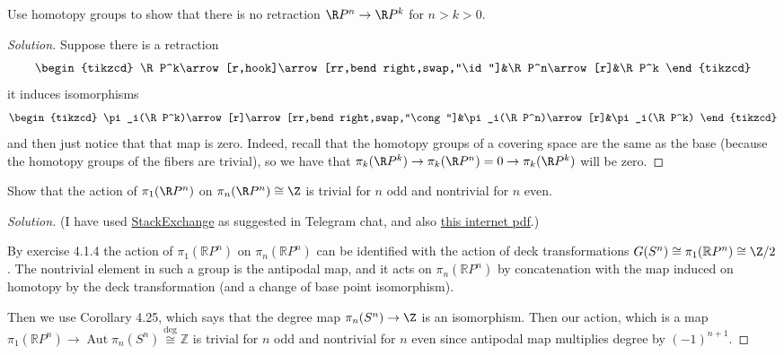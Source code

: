 \begin{exercise}[4.2.1]
	Use homotopy groups to show that there is no retraction $\R P^n\to \R P^k$ for $n>k>0$.
\end{exercise}
\begin{proof}[Solution]
	Suppose there is a retraction
	\[\begin{tikzcd}
		\R P^k\arrow[r,hook]\arrow[rr,bend right,swap,"\id"]&\R P^n\arrow[r]&\R P^k
	\end{tikzcd}\]
	it induces isomorphisms
	\[\begin{tikzcd}
		\pi_i(\R P^k)\arrow[r]\arrow[rr,bend right,swap,"\cong"]&\pi_i(\R P^n)\arrow[r]&\pi_i(\R P^k)
	\end{tikzcd}\]
	and then just notice that that map is zero. Indeed, recall that the homotopy groups of a covering space are the same as the base (because the homotopy groups of the fibers are trivial), so we have that $\pi_k(\R P^k)\to\pi_k(\R P^n)=0\to\pi_k(\R P^k)$ will be zero. 
\end{proof}

\begin{exercise}[4.2.2]
	Show that the action of $\pi_1(\R P^n)$ on $\pi_n(\R P^n)\cong\Z$ is trivial for $n$ odd and nontrivial for $n$ even.
\end{exercise}
\begin{proof}[Solution]
	(I have used \href{https://math.stackexchange.com/questions/375968/the-action-of-the-group-of-deck-transformation-on-the-higher-homotopy-groups}{StackExchange} as suggested in Telegram chat, and also \href{https://pages.uoregon.edu/njp/hw7solutions.pdf}{this internet pdf}.)

	By exercise 4.1.4 the action of $\pi_{1}(\mathbb{R}P^{n})$ on $\pi_{n}(\mathbb{R}P^{n})$ can be identified with the action of deck transformations $G(S^{n})\cong \pi_{1}(\mathbb{R}P^{n})\cong \Z/2$. The nontrivial element in such a group is the antipodal map, and it acts on $\pi_{n}(\mathbb{R}P^{n})$ by concatenation with the map induced on homotopy by the deck transformation (and a change of base point isomorphism).

	Then we use Corollary 4.25, which says that the degree map $\pi_{n}(S^{n})\to\Z$ is an isomorphism. Then our action, which is a map $\pi_{1}(\mathbb{R}P^{n})\to \operatorname{Aut}\pi_{n}(S^{n})\overset{\operatorname{deg}}{\cong } \mathbb{Z}$ is trivial for $n$ odd and nontrivial for $n$ even since antipodal map multiplies degree by $(-1)^{n+1}$.
\end{proof}


